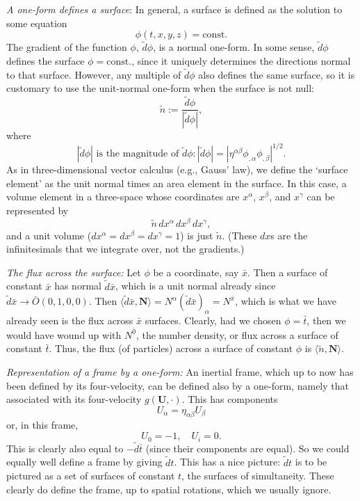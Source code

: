 \documentclass[12pt]{book}
\begin{document}
    \textit{A one-form defines a surface}: 
    In general, a surface is defined as the solution to some equation
    \[
    \phi(t, x, y, z) = \text{const.}
    \]
    The gradient of the function \(\phi\), \(\tilde{d}\phi\), is a normal one-form. In some sense, \(\tilde{d}\phi\) defines the surface \(\phi = \text{const.}\), since it uniquely determines the directions normal to that surface. However, any multiple of \(\tilde{d}\phi\) also defines the same surface, so it is customary to use the unit-normal one-form when the surface is not null:
    \[
    \tilde{n} := \frac{\tilde{d}\phi}{|\tilde{d}\phi|}, \tag{4.7}
    \]
    where
    \[
    |\tilde{d}\phi| \text{ is the magnitude of } \tilde{d}\phi : |\tilde{d}\phi| = \left|\eta^{\alpha\beta} \phi_{,\alpha} \phi_{,\beta}\right|^{1/2}. \tag{4.8}
    \]
    As in three-dimensional vector calculus (e.g., Gauss’ law), we define the ‘surface element’ as the unit normal times an area element in the surface. In this case, a volume element in a three-space whose coordinates are \(x^\alpha\), \(x^\beta\), and \(x^\gamma\) can be represented by
    \[
    \tilde{n} \, dx^\alpha \, dx^\beta \, dx^\gamma, \tag{4.9}
    \]
    and a unit volume (\(dx^\alpha = dx^\beta = dx^\gamma = 1\)) is just \(\tilde{n}\). (These \(dx\)s are the infinitesimals that we integrate over, not the gradients.)

    \textit{The flux across the surface:} 
    Let \(\phi\) be a coordinate, say \(\bar{x}\). Then a surface of constant \(\bar{x}\) has normal \(\tilde{d} \bar{x}\), which is a unit normal already since \(\tilde{d} \bar{x} \rightarrow \bar{O} (0, 1, 0, 0)\). Then \(\langle \tilde{d} \bar{x}, \mathbf{N} \rangle = N^\alpha (\tilde{d} \bar{x})_\alpha = N^{\bar{x}}\), which is what we have already seen is the flux across \(\bar{x}\) surfaces. Clearly, had we chosen \(\phi = \bar{t}\), then we would have wound up with \(N^{\bar{0}}\), the number density, or flux across a surface of constant \(\bar{t}\). Thus, the flux (of particles) across a surface of constant \(\phi\) is \(\langle \tilde{n}, \mathbf{N} \rangle\).

    \textit{Representation of a frame by a one-form:} 
    An inertial frame, which up to now has been defined by its four-velocity, can be defined also by a one-form, namely that associated with its four-velocity \(g(\mathbf{U}, \cdot)\). This has components
    \[
    U_\alpha = \eta_{\alpha\beta} U_\beta
    \]
    or, in this frame,
    \[
    U_0 = -1, \quad U_i = 0.
    \]
    This is clearly also equal to \(-\tilde{d}\bar{t}\) (since their components are equal). So we could equally well define a frame by giving \(\tilde{d} t\). This has a nice picture: \(\tilde{d} t\) is to be pictured as a set of surfaces of constant \(t\), the surfaces of simultaneity. These clearly do define the frame, up to spatial rotations, which we usually ignore.
\end{document}

